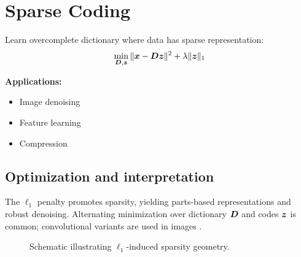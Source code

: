 
\section{Sparse Coding}
\label{sec:sparse-coding}

Learn overcomplete dictionary where data has sparse representation:
\begin{equation}
\min_{\boldsymbol{D}, \boldsymbol{z}} \|\boldsymbol{x} - \boldsymbol{D}\boldsymbol{z}\|^2 + \lambda \|\boldsymbol{z}\|_1
\end{equation}

\textbf{Applications:}
\begin{itemize}
    \item Image denoising
    \item Feature learning
    \item Compression
\end{itemize}

\subsection{Optimization and interpretation}

The $\ell_1$ penalty promotes sparsity, yielding parts-based representations and robust denoising. Alternating minimization over dictionary $\boldsymbol{D}$ and codes $\boldsymbol{z}$ is common; convolutional variants are used in images \textcite{GoodfellowEtAl2016}.

\begin{figure}[h]
  \centering
  \caption{Schematic illustrating $\ell_1$-induced sparsity geometry.}
  \label{fig:l1-geometry}
\end{figure}
